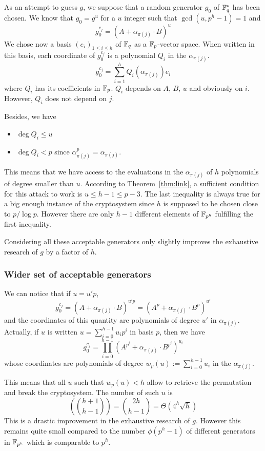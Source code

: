 \documentclass[a4paper]{article}
\newcommand{\GF}[1]{\F_{#1}}
\begin{document}
As an attempt to guess $g$, we suppose that a random generator $g_0$ of $\GF{q}^{*}$ has been chosen. We know that $g_0 = g^u$ for a $u$ integer such that $\gcd(u, p^h-1) = 1$ and
$$ g_0 ^{c_j} = (A + \alpha_{\pi(j)} \cdot B)^u $$
We chose now a basis $(e_i)_{1 \leq i \leq h}$ of $\GF{q}$ as a $\GF{p}$-vector space. When written in this basis, each coordinate of $g_0^{c_j}$ is a polynomial $Q_i$ in the $\alpha_{\pi(j)}$.
$$ g_0^{c_j} = \sum_{i=1}^h Q_i(\alpha_{\pi(j)}) e_i $$
where $Q_i$ has its coefficients in $\GF{p}$.
$Q_i$ depends on $A$, $B$, $u$ and obviously on $i$. However, $Q_i$ does not depend on $j$.

Besides, we have
\begin{itemize}
\item $\deg Q_i \leq u$
\item $\deg Q_i < p$ since $\alpha_{\pi(j)}^p = \alpha_{\pi(j)}$.
\end{itemize}

This means that we have access to the evaluations in the $\alpha_{\pi(j)}$ of $h$ polynomials of degree smaller than $u$. According to Theorem~\ref{thm:link}, a sufficient condition for this attack to work is $u \leq h-1 \leq p-3$. The last inequality is  always true for a big enough instance of the cryptosystem since $h$ is supposed to be chosen close to $p / \log p$. However there are only $h-1$ different elements of $\GF{p^h}$ fulfilling the first inequality.

Considering all these acceptable generators only slightly improves the exhaustive research of $g$ by a factor of $h$.


\subsubsection{Wider set of acceptable generators}

We can notice that if $u = u'p$,
$$ g_0^{c_j} = (A + \alpha_{\pi(j)} \cdot B)^{u'p} = (A^p + \alpha_{\pi(j)} \cdot B^p)^{u'} $$
and the coordinates of this quantity are polynomials of degree $u'$ in $\alpha_{\pi(j)}$.
Actually, if $u$ is written $u = \sum_{i=0}^{h-1} u_i p^i$ in basis $p$, then we have
$$ g_0^{c_j} = \prod_{i=0}^{h-1} (A^{p^i} + \alpha_{\pi(j)} \cdot B^{p^i} )^{u_i} $$
whose coordinates are polynomials of degree $w_p(u) := \sum_{i=0}^{h-1} u_i$ in the $\alpha_{\pi(j)}$.

This means that all $u$ such that $w_p(u) < h$ allow to retrieve the permutation and break the cryptosystem.
The number of such $u$ is
$$ \left( \binom{h+1}{h-1} \right) = \binom{2h}{h-1} =\Theta\left( 4^h \sqrt{h} \right) $$
This is a drastic improvement in the exhaustive research of $g$. However this remains quite small compared to the number $\phi(p^h-1)$ of different generators in $\GF{p^h}$ which is comparable to $p^h$.
\end{document}
